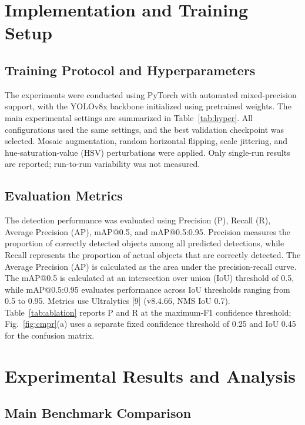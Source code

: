 \documentclass[conference]{IEEEtran}
\begin{document}
\section{Implementation and Training Setup}

\subsection{Training Protocol and Hyperparameters}

The experiments were conducted using PyTorch with automated mixed-precision support, with the YOLOv8x backbone initialized using pretrained weights. The main experimental settings are summarized in Table~\ref{tab:hyper}. All configurations used the same settings, and the best validation checkpoint was selected. Mosaic augmentation, random horizontal flipping, scale jittering, and hue-saturation-value (HSV) perturbations were applied. Only single-run results are reported; run-to-run variability was not measured.

\subsection{Evaluation Metrics}

The detection performance was evaluated using Precision (P), Recall (R), Average Precision (AP), mAP@0.5, and mAP@0.5:0.95. Precision measures the proportion of correctly detected objects among all predicted detections, while Recall represents the proportion of actual objects that are correctly detected. The Average Precision (AP) is calculated as the area under the precision-recall curve. The mAP@0.5 is calculated at an intersection over union (IoU) threshold of 0.5, while mAP@0.5:0.95 evaluates performance across IoU thresholds ranging from 0.5 to 0.95. Metrics use Ultralytics [9] (v8.4.66, NMS IoU 0.7). Table~\ref{tab:ablation} reports P and R at the maximum-F1 confidence threshold; Fig.~\ref{fig:cmpr}(a) uses a separate fixed confidence threshold of 0.25 and IoU 0.45 for the confusion matrix.

\section{Experimental Results and Analysis}

\subsection{Main Benchmark Comparison}
\end{document}
